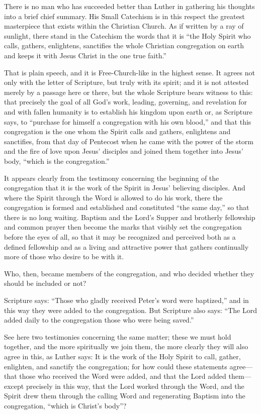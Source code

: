 There is no man who has succeeded better than Luther in gathering his thoughts into a brief chief summary. His Small Catechism is in this respect the greatest masterpiece that exists within the Christian Church. As if written by a ray of sunlight, there stand in the Catechism the words that it is “the Holy Spirit who calls, gathers, enlightens, sanctifies the whole Christian congregation on earth and keeps it with Jesus Christ in the one true faith.”

That is plain speech, and it is Free-Church-like in the highest sense. It agrees not only with the letter of Scripture, but truly with its spirit; and it is not attested merely by a passage here or there, but the whole Scripture bears witness to this: that precisely the goal of all God’s work, leading, governing, and revelation for and with fallen humanity is to establish his kingdom upon earth or, as Scripture says, to “purchase for himself a congregation with his own blood,” and that this congregation is the one whom the Spirit calls and gathers, enlightens and sanctifies, from that day of Pentecost when he came with the power of the storm and the fire of love upon Jesus’ disciples and joined them together into Jesus’ body, “which is the congregation.”

It appears clearly from the testimony concerning the beginning of the congregation that it is the work of the Spirit in Jesus’ believing disciples. And where the Spirit through the Word is allowed to do his work, there the congregation is formed and established and constituted “the same day,” so that there is no long waiting. Baptism and the Lord’s Supper and brotherly fellowship and common prayer then become the marks that visibly set the congregation before the eyes of all, so that it may be recognized and perceived both as a defined fellowship and as a living and attractive power that gathers continually more of those who desire to be with it.

Who, then, became members of the congregation, and who decided whether they should be included or not?

Scripture says: “Those who gladly received Peter’s word were baptized,” and in this way they were added to the congregation. But Scripture also says: “The Lord added daily to the congregation those who were being saved.”

See here two testimonies concerning the same matter; these we must hold together, and the more spiritually we join them, the more clearly they will also agree in this, as Luther says: It is the work of the Holy Spirit to call, gather, enlighten, and sanctify the congregation; for how could these statements agree—that those who received the Word were added, and that the Lord added them—except precisely in this way, that the Lord worked through the Word, and the Spirit drew them through the calling Word and regenerating Baptism into the congregation, “which is Christ’s body”?


